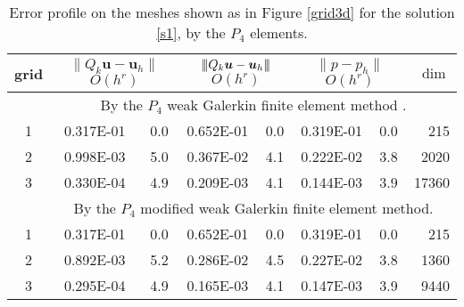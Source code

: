 \documentclass[11pt]{amsart}
\def\3bar{{|\hspace{-.02in}|\hspace{-.02in}|}}
\begin{document}
\begin{table}[ht]
  \centering  \renewcommand{\arraystretch}{1.2}
  \caption{Error profile on the meshes shown as in Figure \ref{grid3d}
    for the solution \eqref{s1}, by the $P_4$ elements. }
  \label{t4}
\begin{tabular}{c|cc|cc|cc|r}
\hline
grid & \multicolumn{2}{c|}{ $\|Q_k \bm{u}-\bm{u}_h\| $    $O(h^r)$}
   & \multicolumn{2}{c|}{  $\3bar{Q_k \bm{u}-\bm{u}_h}\3bar$  $O(h^r)$}
    &  \multicolumn{2}{c|}{ $ \| p-p_h\| $  $O(h^r)$}& $\dim$  
  \\ \hline
    &  \multicolumn{7}{c}{ By the  $P_4$ weak Galerkin finite element method \cite{Mu-W-Y-Z}. }   \\
\hline 
 1&   0.317E-01& 0.0&   0.652E-01& 0.0&   0.319E-01& 0.0&    215 \\
 2&   0.998E-03& 5.0&   0.367E-02& 4.1&   0.222E-02& 3.8&   2020 \\
 3&   0.330E-04& 4.9&   0.209E-03& 4.1&   0.144E-03& 3.9&  17360 \\
\hline
    &  \multicolumn{7}{c}{ By the  $P_4$ modified weak Galerkin finite element method. }   \\
\hline
 1&   0.317E-01& 0.0&   0.652E-01& 0.0&   0.319E-01& 0.0&    215 \\
 2&   0.892E-03& 5.2&   0.286E-02& 4.5&   0.227E-02& 3.8&   1360 \\
 3&   0.295E-04& 4.9&   0.165E-03& 4.1&   0.147E-03& 3.9&   9440 \\
\hline
    \end{tabular}%
\end{table}%
\end{document}
